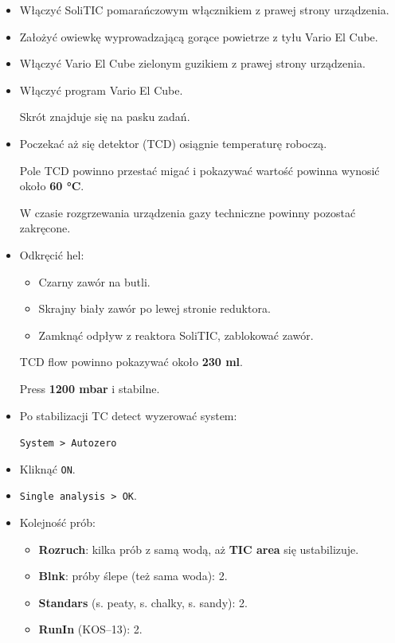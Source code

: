 \documentclass[
  letterpaper,
  DIV=11,
  numbers=noendperiod]{scrreprt}
\begin{document}
\begin{itemize}
\item
  Włączyć SoliTIC pomarańczowym włącznikiem z prawej strony urządzenia.
\item
  Założyć owiewkę wyprowadzającą gorące powietrze z tyłu Vario El Cube.
\item
  Włączyć Vario El Cube zielonym guzikiem z prawej strony urządzenia.
\item
  Włączyć program Vario El Cube.

  Skrót znajduje się na pasku zadań.
\item
  Poczekać aż się detektor (TCD) osiągnie temperaturę roboczą.

  Pole TCD powinno przestać migać i pokazywać wartość powinna wynosić
  około \textbf{60 °C}.

  W czasie rozgrzewania urządzenia gazy techniczne powinny pozostać
  zakręcone.
\item
  Odkręcić hel:

  \begin{itemize}
  \item
    Czarny zawór na butli.
  \item
    Skrajny biały zawór po lewej stronie reduktora.
  \item
    Zamknąć odpływ z reaktora SoliTIC, zablokować zawór.
  \end{itemize}

  TCD flow powinno pokazywać około \textbf{230 ml}.

  Press \textbf{1200 mbar} i stabilne.
\item
  Po stabilizacji TC detect wyzerować system:

  \texttt{System\ \textgreater{}\ Autozero}
\item
  Kliknąć \texttt{ON}.
\item
  \texttt{Single\ analysis\ \textgreater{}\ OK}.
\item
  Kolejność prób:

  \begin{itemize}
  \item
    \textbf{Rozruch}: kilka prób z samą wodą, aż \textbf{TIC area} się
    ustabilizuje.
  \item
    \textbf{Blnk}: próby ślepe (też sama woda): 2.
  \item
    \textbf{Standars} (s. peaty, s. chalky, s. sandy): 2.
  \item
    \textbf{RunIn} (KOS--13): 2.
  \end{itemize}
\end{itemize}
\end{document}
